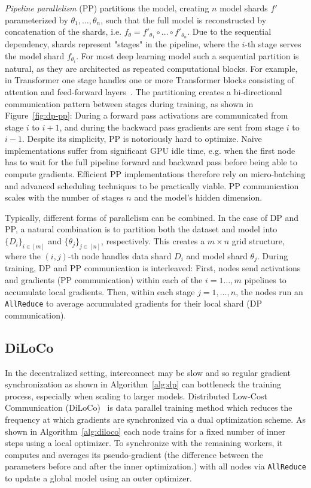 \documentclass{article}
\begin{document}
\textit{Pipeline parallelism} (PP) partitions the model, creating $n$ model
shards $f'$ parameterized by $\theta_1,\dots,\theta_n$, such that the full model
is reconstructed by concatenation of the shards, i.e.
$f_{\theta}=f'_{\theta_1}\circ\dots\circ f'_{\theta_n}$. Due to the sequential
dependency, shards represent "stages" in the pipeline, where the $i$-th stage
serves the model shard $f_{\theta_i}$. For most deep learning model such a
sequential partition is natural, as they are architected as repeated
computational blocks. For example, in Transformer one stage handles one or more
Transformer blocks consisting of attention and feed-forward
layers~\cite{vaswani2017}. The partitioning creates a bi-directional
communication pattern between stages during training, as shown in
Figure~\ref{fig:dp-pp}: During a forward pass activations are communicated from
stage $i$ to $i+1$, and during the backward pass gradients are sent from stage
$i$ to $i-1$. Despite its simplicity, PP is notoriously hard to optimize. Naive
implementations suffer from significant GPU idle time, e.g. when the first node
has to wait for the full pipeline forward and backward pass before being able to
compute gradients. Efficient PP implementations therefore rely on micro-batching
and advanced scheduling techniques to be practically viable. PP communication
scales with the number of stages $n$ and the model's hidden dimension.

Typically, different forms of parallelism can be combined. In the case of DP and
PP, a natural combination is to partition both the dataset and model into
$\{D_i\}_{i\in [m]}$ and $\{\theta_j\}_{j\in [n]}$, respectively. This creates a
$m\times n$ grid structure, where the $(i,j)$-th node handles data shard $D_i$
and model shard $\theta_j$. During training, DP and PP communication is
interleaved: First, nodes send activations and gradients (PP communication)
within each of the $i=1\dots,m$ pipelines to accumulate local gradients. Then,
within each stage $j=1,\dots,n$, the nodes run an \texttt{AllReduce} to average
accumulated gradients for their local shard (DP communication).

\subsection{DiLoCo}

In the decentralized setting, interconnect may be slow and so regular gradient
synchronization as shown in Algorithm~\ref{alg:dp} can bottleneck the training
process, especially when scaling to larger models. Distributed Low-Cost
Communication (DiLoCo)~\cite{douillard2023} is data parallel training method
which reduces the frequency at which gradients are synchronized via a dual
optimization scheme. As shown in Algorithm~\ref{alg:diloco} each node trains for
a fixed number of inner steps using a local optimizer. To synchronize with the
remaining workers, it computes and averages its pseudo-gradient (the difference
between the parameters before and after the inner optimization.) with all nodes
via \texttt{AllReduce} to update a global model using an outer optimizer. 
\end{document}
